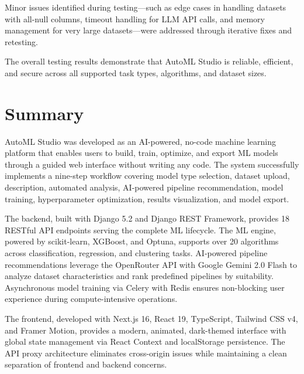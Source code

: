 \documentclass[12pt,a4paper]{report}
\begin{document}
Minor issues identified during testing—such as edge cases in handling datasets with all-null columns, timeout handling for LLM API calls, and memory management for very large datasets—were addressed through iterative fixes and retesting.

The overall testing results demonstrate that AutoML Studio is reliable, efficient, and secure across all supported task types, algorithms, and dataset sizes.


\setcounter{chapter}{7}
\clearpage
\thispagestyle{empty}

\noindent
{}

\clearpage
{}
\setcounter{section}{0}


\section{Summary}

AutoML Studio was developed as an AI-powered, no-code machine learning platform that enables users to build, train, optimize, and export ML models through a guided web interface without writing any code. The system successfully implements a nine-step workflow covering model type selection, dataset upload, description, automated analysis, AI-powered pipeline recommendation, model training, hyperparameter optimization, results visualization, and model export.

The backend, built with Django 5.2 and Django REST Framework, provides 18 RESTful API endpoints serving the complete ML lifecycle. The ML engine, powered by scikit-learn, XGBoost, and Optuna, supports over 20 algorithms across classification, regression, and clustering tasks. AI-powered pipeline recommendations leverage the OpenRouter API with Google Gemini 2.0 Flash to analyze dataset characteristics and rank predefined pipelines by suitability. Asynchronous model training via Celery with Redis ensures non-blocking user experience during compute-intensive operations.

The frontend, developed with Next.js 16, React 19, TypeScript, Tailwind CSS v4, and Framer Motion, provides a modern, animated, dark-themed interface with global state management via React Context and localStorage persistence. The API proxy architecture eliminates cross-origin issues while maintaining a clean separation of frontend and backend concerns.
\end{document}
